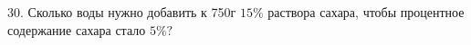 30. Сколько воды нужно добавить к 750г $15\%$ раствора сахара, чтобы процентное содержание сахара стало $5\%?$\\
